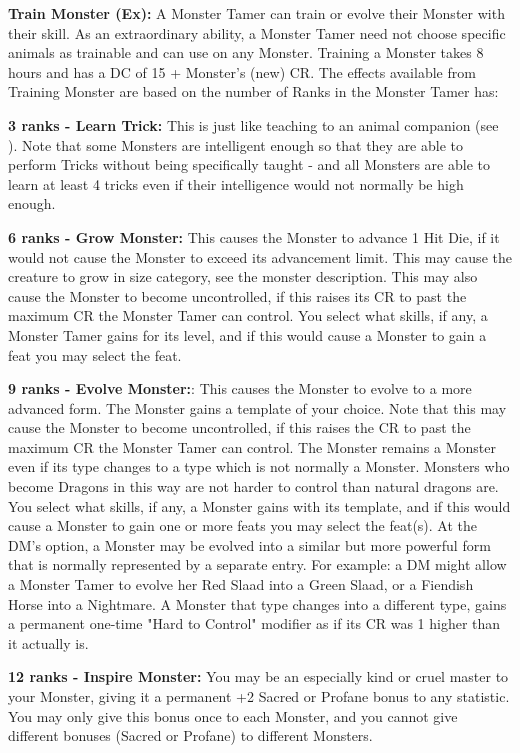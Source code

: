 \textbf{Train Monster (Ex):} A Monster Tamer can train or evolve their Monster with their  skill. As an extraordinary ability,
a Monster Tamer need not choose specific animals as trainable and can use  on any Monster. Training a Monster
takes 8 hours and has a DC of 15 + Monster's (new) CR. The effects available from Training Monster are based on the number of
Ranks in  the Monster Tamer has:

\begin{itemize*}
\item \textbf{3 ranks - Learn Trick:}  This is just like teaching to an animal companion (see ). Note that some Monsters are intelligent enough so that they are able to perform Tricks without being specifically taught - and all Monsters are able to learn at least 4 tricks even if their intelligence would not normally be high enough.
\item \textbf{6 ranks - Grow Monster:} This causes the Monster to advance 1 Hit Die, if it would not cause the Monster to exceed its advancement limit. This may cause the creature to grow in size category, see the monster description. This may also cause the Monster to become uncontrolled, if this raises its CR to past the maximum CR the Monster Tamer can control. You select
what skills, if any, a Monster Tamer gains for its level, and if this would cause a Monster to gain a feat you may select the feat.
\item \textbf{9 ranks - Evolve Monster:}: This causes the Monster to evolve to a more advanced form. The Monster gains a template of your choice. Note that this may cause the Monster to become uncontrolled, if this raises the CR to past the maximum CR the Monster Tamer can control. The Monster remains a Monster even if its type changes to a type which is not normally a Monster. Monsters who become Dragons in this way are not harder to control than natural dragons are. You select what skills, if any, a Monster gains with its template, and if this would cause a Monster to gain one or more feats you may select the feat(s). At the DM's option, a Monster may be evolved into a similar but more powerful form that is normally represented by a separate entry. For example: a DM might allow a Monster Tamer to evolve her Red Slaad into a Green Slaad, or a Fiendish Horse into a Nightmare. A Monster that type changes into a different type, gains a permanent one-time "Hard to Control" modifier as if its CR was 1 higher than it actually is.
\item \textbf{12 ranks - Inspire Monster:} You may be an especially kind or cruel master to your Monster, giving it a permanent +2 Sacred or Profane bonus to any statistic. You may only give this bonus once to each Monster, and you cannot give different bonuses (Sacred or Profane) to different Monsters.
\end{itemize*}

